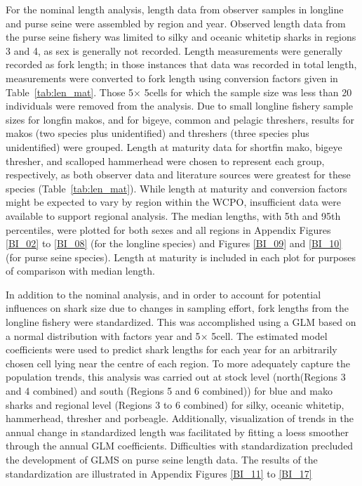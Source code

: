 \documentclass[12pt]{SCreport}
\begin{document}
For the nominal length analysis, length data from observer samples in longline and purse seine were assembled by region and year.  Observed length data from the purse seine fishery was limited to silky and oceanic whitetip sharks in regions 3 and 4, as sex is generally not recorded.  Length measurements were generally recorded as fork length; in those instances that data was recorded in total length, measurements were converted to fork length using conversion factors given in Table~\ref{tab:len_mat}. Those 5\degree $\times$ 5\degree cells for which the sample size was less than 20 individuals were removed from the analysis.  Due to small longline fishery sample sizes for longfin makos, and for bigeye, common and pelagic threshers, results for makos (two species plus unidentified) and threshers (three species plus unidentified) were grouped. Length at maturity data for shortfin mako, bigeye thresher, and scalloped hammerhead were chosen to represent each group, respectively, as both observer data and literature sources were greatest for these species (Table~\ref{tab:len_mat}). While length at maturity and conversion factors might be expected to vary by region within the WCPO, insufficient data
were available to support regional analysis. The median lengths, with 5th and 95th percentiles, were plotted for both sexes and all regions in Appendix Figures \ref{BI_02} to \ref{BI_08} (for the longline species) and Figures \ref{BI_09} and \ref{BI_10} (for purse seine species).  Length at maturity is included in each plot for purposes of comparison with median length.

In addition to the nominal analysis, and in order to account for potential influences on shark size due to changes in sampling effort, fork lengths from the longline fishery were standardized. This was accomplished using a GLM based on a normal distribution with factors year and 5\degree $\times$ 5\degree cell. The estimated model coefficients were used to predict shark lengths for each year for an arbitrarily chosen cell lying near the centre of each region. To more adequately capture the population trends, this analysis was carried out at stock level (north(Regions 3 and 4 combined) and south (Regions 5 and 6 combined)) for blue and mako sharks and regional level (Regions 3 to 6 combined) for silky, oceanic whitetip, hammerhead, thresher and porbeagle.  Additionally, visualization of trends in the annual change in standardized length was facilitated by fitting a loess smoother through the annual GLM coefficients.  Difficulties with standardization precluded the development of GLMS on purse seine length data. The results of the standardization are illustrated in Appendix Figures \ref{BI_11} to \ref{BI_17}
\end{document}
